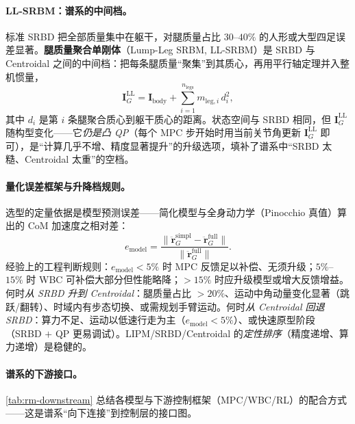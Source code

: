 \paragraph{LL-SRBM：谱系的中间档。}
标准 SRBD 把全部质量集中在躯干，对腿质量占比 $30$–$40\%$ 的人形或大型四足误差显著。\textbf{腿质量聚合单刚体}（Lump-Leg SRBM, LL-SRBM）是 SRBD 与 Centroidal 之间的中间档：把每条腿质量“聚集”到其质心，再用平行轴定理并入整机惯量，
\begin{equation}
  \mathbf{I}_G^{\mathrm{LL}}=\mathbf{I}_{\mathrm{body}}+\sum_{i=1}^{n_{\mathrm{legs}}}m_{\mathrm{leg},i}\,d_i^2,
  \label{eq:rm-llsrbm}
\end{equation}
其中 $d_i$ 是第 $i$ 条腿聚合质心到躯干质心的距离。状态空间与 SRBD 相同，但 $\mathbf{I}_G^{\mathrm{LL}}$ 随构型变化——它\emph{仍是凸 QP}（每个 MPC 步开始时用当前关节角更新 $\mathbf{I}_G^{\mathrm{LL}}$ 即可），是“计算几乎不增、精度显著提升”的升级选项，填补了谱系中“SRBD 太糙、Centroidal 太重”的空档。

\paragraph{量化误差框架与升降档规则。}
选型的定量依据是模型预测误差——简化模型与全身动力学（Pinocchio 真值）算出的 CoM 加速度之相对差：
\begin{equation}
  e_{\mathrm{model}}=\frac{\big\|\ddot{\mathbf{r}}_G^{\mathrm{simpl}}-\ddot{\mathbf{r}}_G^{\mathrm{full}}\big\|}
  {\big\|\ddot{\mathbf{r}}_G^{\mathrm{full}}\big\|}.
  \label{eq:rm-emodel}
\end{equation}
经验上的工程判断规则：$e_{\mathrm{model}}<5\%$ 时 MPC 反馈足以补偿、无须升级；$5\%$–$15\%$ 时 WBC 可补偿大部分但性能略降；$>15\%$ 时应升级模型或增大反馈增益。何时\emph{从 SRBD 升到 Centroidal}：腿质量占比 $>20\%$、运动中角动量变化显著（跳跃/翻转）、时域内有步态切换、或需规划手臂运动。何时\emph{从 Centroidal 回退 SRBD}：算力不足、运动以低速行走为主（$e_{\mathrm{model}}<5\%$）、或快速原型阶段（SRBD $+$ QP 更易调试）。LIPM/SRBD/Centroidal 的\emph{定性排序}（精度递增、算力递增）是稳健的。

\paragraph{谱系的下游接口。}
\cref{tab:rm-downstream} 总结各模型与下游控制框架（MPC/WBC/RL）的配合方式——这是谱系“向下连接”到控制层的接口图。

